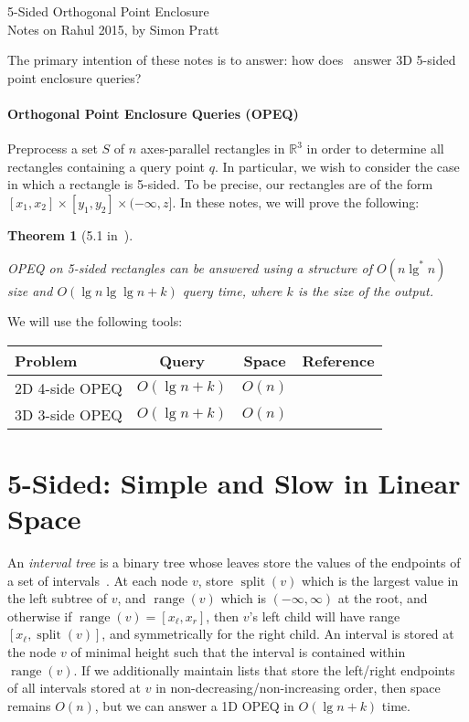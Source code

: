 \documentclass[letterpaper,12pt,twocolumn]{article}
\DeclareMathOperator{\splt}{split}
\DeclareMathOperator{\range}{range}
\newcommand{\BigOh}[1]{O\!\left(#1\right)}
\newcommand\IR{\mathbb{R}}
\newcommand\bounds[1]{[#1]}
\newcommand\lbounds[1]{(#1]} %
\theoremstyle{plain}
\newtheorem{theorem}{Theorem}
\begin{document}
{\noindent\Large 5-Sided Orthogonal Point Enclosure}\\
{\noindent Notes on Rahul 2015, by Simon Pratt}

The primary intention of these notes is to answer: how
does~\cite{saladi2015improved} answer 3D 5-sided point enclosure
queries?

\paragraph{Orthogonal Point Enclosure Queries (OPEQ)}
Preprocess a set $S$ of $n$ axes-parallel rectangles in $\IR^3$ in
order to determine all rectangles containing a query point $q$.  In
particular, we wish to consider the case in which a rectangle is
5-sided.  To be precise, our rectangles are of the form
$\bounds{x_1,x_2} \times \bounds{y_1, y_2} \times
\lbounds{-\infty,z}$.  In these notes, we will prove the following:

\begin{theorem}[5.1 in~\cite{saladi2015improved}]\label{thm:51}

  OPEQ on 5-sided rectangles can be answered using a structure of
  $\BigOh{n\lg^* n}$ size and $\BigOh{\lg n \lg\lg n + k}$ query time,
  where $k$ is the size of the output.

\end{theorem}

We will use the following tools:

\noindent\begin{tabular}{lccr}
    \toprule
    Problem & Query & Space & Reference \\
    \midrule
    2D 4-side OPEQ & $\BigOh{\lg n + k}$ & $\BigOh{n}$ & \cite{chazelle1986filtering} \\ %
    3D 3-side OPEQ & $\BigOh{\lg n + k}$ & $\BigOh{n}$ & \cite{afshani2008dominance} \\ %
    \bottomrule
\end{tabular}

\section{5-Sided: Simple and Slow in Linear Space}

An \emph{interval tree} is a binary tree whose leaves store the values
of the endpoints of a set of intervals~\cite{edelsbrunner1983new}.  At
each node $v$, store $\splt(v)$ which is the largest value in the left
subtree of $v$, and $\range(v)$ which is $(-\infty,\infty)$ at the
root, and otherwise if $\range(v) = [x_\ell, x_r]$, then $v$'s left
child will have range $[x_\ell, \splt(v)]$, and symmetrically for the
right child.  An interval is stored at the node $v$ of minimal height
such that the interval is contained within $\range(v)$.  If we
additionally maintain lists that store the left/right endpoints of all
intervals stored at $v$ in non-decreasing/non-increasing order, then
space remains $\BigOh{n}$, but we can answer a 1D OPEQ in $\BigOh{\lg
  n + k}$ time.
\end{document}
